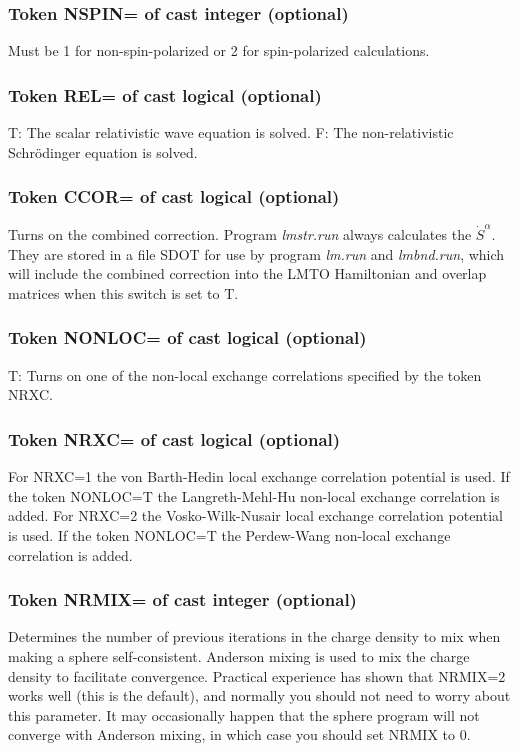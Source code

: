 \documentclass[aps,twocolumn,a4]{revtex4}
\begin{document}
\subsubsection{Token NSPIN= of cast integer (optional)}
Must be 1 for non-spin-polarized or 2 for spin-polarized
calculations.

\subsubsection{Token REL= of cast logical (optional)}
T: The scalar relativistic wave equation is solved.
F: The non-relativistic Schr\"odinger equation is solved.

\subsubsection{Token CCOR= of cast logical (optional)}
Turns on the combined correction.  Program {\em lmstr.run} always
calculates the $\dot S^{\alpha }$.  They are stored in a file SDOT for
use by program {\em lm.run} and {\em lmbnd.run},
which will include the combined correction
into the LMTO Hamiltonian and overlap matrices
when this switch is set to T.

\subsubsection{Token NONLOC= of cast logical (optional)}
T: Turns on one of the non-local exchange correlations specified by the
token NRXC.
\subsubsection{Token NRXC= of cast logical (optional)}
For NRXC=1 the von Barth-Hedin local exchange correlation potential is
used. If the token NONLOC=T the Langreth-Mehl-Hu non-local exchange
correlation is added.
For NRXC=2 the Vosko-Wilk-Nusair local exchange correlation potential is
used. If the token NONLOC=T the Perdew-Wang non-local exchange
correlation is added.

\subsubsection{Token NRMIX= of cast integer (optional)}
Determines the number of previous iterations in the charge density to 
mix when making a sphere self-consistent.  Anderson mixing is
used to mix the charge density to facilitate convergence.  Practical
experience has shown that NRMIX=2 works well (this is the default), and
normally you should not need to worry about this parameter.  It may
occasionally happen that the sphere program will not converge with
Anderson mixing, in which case you should set NRMIX to 0.
\end{document}

